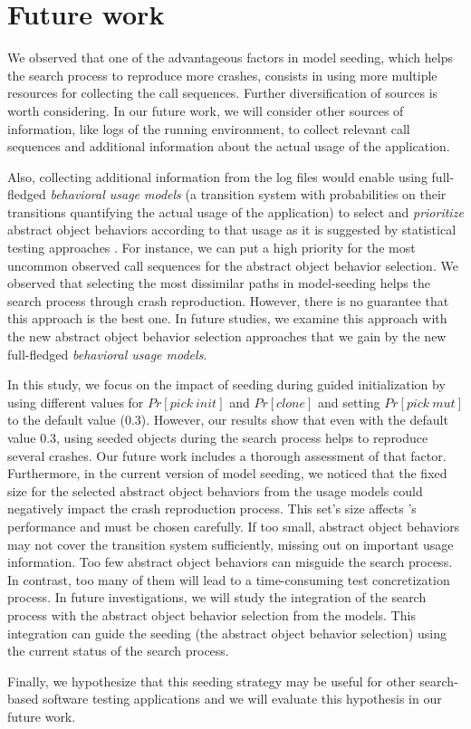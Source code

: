 

\section{Future work}
\label{sec:model_seeding:future}

We observed that one of the advantageous factors in model seeding, which helps the search process to reproduce more crashes, consists in using more multiple resources for collecting the call sequences. Further diversification of sources is worth considering. In our future work, we will consider other sources of information, like logs of the running environment, to collect relevant call sequences and additional information about the actual usage of the application.

Also, collecting additional information from the log files would enable using full-fledged \emph{behavioral usage models} (\ie a transition system with probabilities on their transitions quantifying the actual usage of the application) to select and \emph{prioritize} abstract object behaviors according to that usage as it is suggested by statistical testing approaches \cite{Devroey2017b}.
For instance, we can put a high priority for the most uncommon observed call sequences for the abstract object behavior selection. We observed that selecting the most dissimilar paths in model-seeding helps the search process through crash reproduction. However, there is no guarantee that this approach is the best one. In future studies, we examine this approach with the new abstract object behavior selection approaches that we gain by the new full-fledged \emph{behavioral usage models}.

In this study, we focus on the impact of seeding during guided initialization by using different values for  $Pr[pick\ init]$ and $Pr[clone]$ and setting $Pr[pick\ mut]$ to the default value (0.3). However, our results show that even with the default value 0.3, using seeded objects during the search process helps to reproduce several crashes. Our future work includes a thorough assessment of that factor.
%
Furthermore, in the current version of model seeding, we noticed that the fixed size for the selected abstract object behaviors from the usage models could negatively impact the crash reproduction process. 
This set's size affects \botsing's performance and must be chosen carefully.  If too small, abstract object behaviors may not cover the transition system sufficiently, missing out on important usage information.  Too few abstract object behaviors can misguide the search process. In contrast, too many of them will lead to a time-consuming test concretization process.
In future investigations, we will study the integration of the search process with the abstract object behavior selection from the models. This integration can guide the seeding (\eg the abstract object behavior selection) using the current status of the search process.

Finally, we hypothesize that this seeding strategy may be useful for other search-based software testing applications and we will evaluate this hypothesis in our future work.
